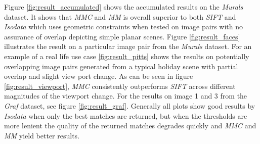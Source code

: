\documentclass[12pt,journal,compsoc]{IEEEtran}
\begin{document}
%
%
Figure \ref{fig:result_accumulated} shows the accumulated results on the 
\emph{Murals} dataset. It shows that \emph{MMC} and \emph{MM} is overall 
superior to both \emph{SIFT} and \emph{Isodata} which uses geometric 
constraints when tested on image pairs with no assurance of overlap 
depicting simple planar scenes. Figure \ref{fig:result_faces} 
illustrates the result on a particular image pair from the \emph{Murals} 
dataset. For an example of a real life use case \ref{fig:result_pitts} 
shows the results on potentially overlapping image pairs generated from 
a typical holiday scene with partial overlap and slight view port 
change. As can be seen in figure \ref{fig:result_viewport}, \emph{MMC} 
consistently outperforms \emph{SIFT} across different magnitudes of the 
viewport change. For the results on image 1 and 3 from the \emph{Graf} 
dataset, see figure \ref{fig:result_graf}.
Generally all plots show good results by \emph{Isodata} when only the 
best matches are returned, but when the thresholds are more lenient the 
quality of the returned matches degrades quickly and \emph{MMC} and 
\emph{MM} yield better results.
\end{document}
